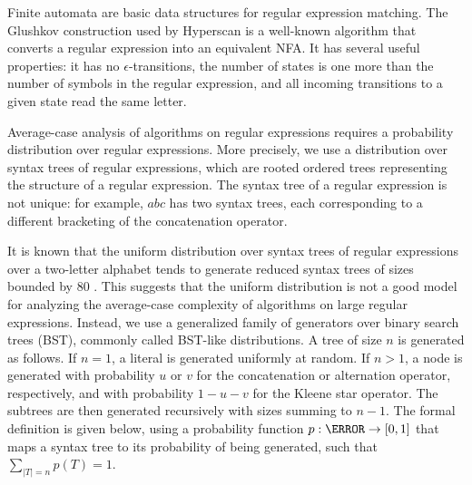 Finite automata are basic data structures for regular expression matching. The Glushkov construction \cite{glushkov1961abstract} used by Hyperscan is a well-known algorithm that converts a regular expression into an equivalent NFA. It has several useful properties: it has no $\epsilon$-transitions, the number of states is one more than the number of symbols in the regular expression, and all incoming transitions to a given state read the same letter.

Average-case analysis of algorithms on regular expressions requires a probability distribution over regular expressions. More precisely, we use a distribution over syntax trees of regular expressions, which are rooted ordered trees representing the structure of a regular expression. The syntax tree of a regular expression is not unique: for example, $abc$ has two syntax trees, each corresponding to a different bracketing of the concatenation operator.

It is known that the uniform distribution over syntax trees of regular expressions over a two-letter alphabet tends to generate reduced syntax trees of sizes bounded by 80 \cite{koechlin2021analysis}. This suggests that the uniform distribution is not a good model for analyzing the average-case complexity of algorithms on large regular expressions. Instead, we use a generalized family of generators over binary search trees (BST), commonly called BST-like distributions. A tree of size $n$ is generated as follows. If $n=1$, a literal is generated uniformly at random. If $n>1$, a node is generated with probability $u$ or $v$ for the concatenation or alternation operator, respectively, and with probability $1-u-v$ for the Kleene star operator. The subtrees are then generated recursively with sizes summing to $n-1$. The formal definition is given below, using a probability function $p:\T \to [0,1]$ that maps a syntax tree to its probability of being generated, such that $\sum_{|T| = n} p(T) = 1$.

